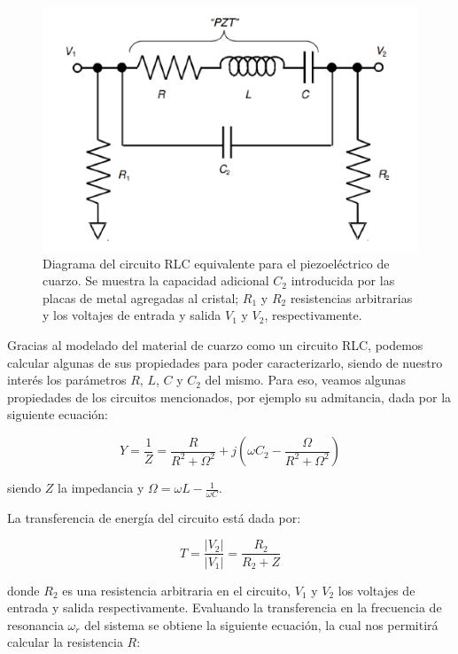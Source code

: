 \documentclass[twoside,twocolumn,a4paper]{article}
\begin{document}
\begin{figure}[H]
\includegraphics[width=\linewidth]{esquemapzt.jpg}
\caption{Diagrama del circuito RLC equivalente para el piezoel\'ectrico de cuarzo. Se muestra la capacidad adicional $C_{2}$ introducida por las placas de metal agregadas al cristal; $R_{1}$ y $R_{2}$ resistencias arbitrarias y los voltajes de entrada y salida $V_{1}$ y $V_{2}$, respectivamente.}
\label{fig:esquemapzt}
\end{figure}

Gracias al modelado del material de cuarzo como un circuito RLC, podemos calcular algunas de sus propiedades para poder caracterizarlo, siendo de nuestro inter\'es los par\'ametros $R$, $L$, $C$ y $C_{2}$ del mismo. Para eso, veamos algunas propiedades de los circuitos mencionados, por ejemplo su admitancia, dada por la siguiente ecuaci\'on:

\begin{equation}
\label{eq:admitancia}
Y = \frac{1}{Z} = \frac{R}{R^{2} + \Omega^{2}} + j(\omega C_{2} - \frac{\Omega}{R^{2} + \Omega^{2}})
\end{equation}

siendo $Z$ la impedancia y $\Omega = \omega L - \frac{1}{\omega C}$.

La transferencia de energ\'ia del circuito est\'a dada por: 

\begin{equation}
\label{eq:transferencia}
T = \frac{|V_{2}|}{|V_{1}|} = \frac{R_{2}}{R_{2} + Z}
\end{equation}

donde $R_{2}$ es una resistencia arbitraria en el circuito, $V_{1}$ y $V_{2}$ los voltajes de entrada y salida respectivamente.
Evaluando la transferencia en la frecuencia de resonancia $\omega_{r}$ del sistema se obtiene la siguiente ecuaci\'on, la cual nos permitir\'a calcular la resistencia $R$:
\end{document}
